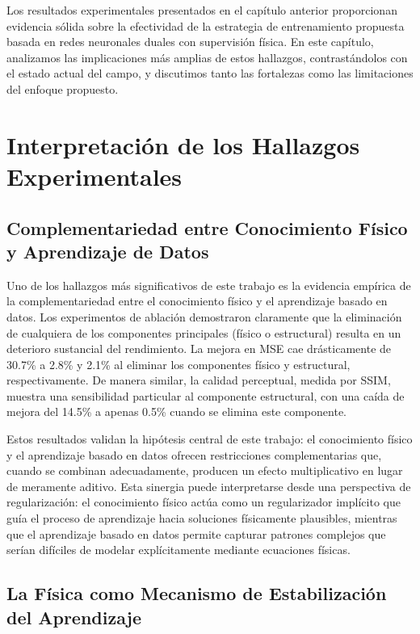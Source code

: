 Los resultados experimentales presentados en el capítulo anterior proporcionan evidencia sólida sobre la efectividad de la estrategia de entrenamiento propuesta basada en redes neuronales duales con supervisión física. En este capítulo, analizamos las implicaciones más amplias de estos hallazgos, contrastándolos con el estado actual del campo, y discutimos tanto las fortalezas como las limitaciones del enfoque propuesto.

\section{Interpretación de los Hallazgos Experimentales}

\subsection{Complementariedad entre Conocimiento Físico y Aprendizaje de Datos}

Uno de los hallazgos más significativos de este trabajo es la evidencia empírica de la complementariedad entre el conocimiento físico y el aprendizaje basado en datos. Los experimentos de ablación demostraron claramente que la eliminación de cualquiera de los componentes principales (físico o estructural) resulta en un deterioro sustancial del rendimiento. La mejora en MSE cae drásticamente de 30.7\% a 2.8\% y 2.1\% al eliminar los componentes físico y estructural, respectivamente. De manera similar, la calidad perceptual, medida por SSIM, muestra una sensibilidad particular al componente estructural, con una caída de mejora del 14.5\% a apenas 0.5\% cuando se elimina este componente.

Estos resultados validan la hipótesis central de este trabajo: el conocimiento físico y el aprendizaje basado en datos ofrecen restricciones complementarias que, cuando se combinan adecuadamente, producen un efecto multiplicativo en lugar de meramente aditivo. Esta sinergia puede interpretarse desde una perspectiva de regularización: el conocimiento físico actúa como un regularizador implícito que guía el proceso de aprendizaje hacia soluciones físicamente plausibles, mientras que el aprendizaje basado en datos permite capturar patrones complejos que serían difíciles de modelar explícitamente mediante ecuaciones físicas.

\subsection{La Física como Mecanismo de Estabilización del Aprendizaje}

